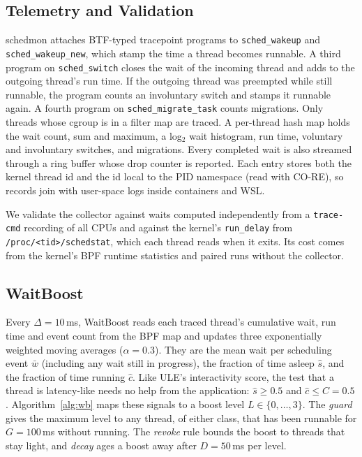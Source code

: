 \documentclass[conference]{IEEEtran}
\newcommand{\ms}{\,ms}
\begin{document}
\subsection{Telemetry and Validation}
schedmon attaches BTF-typed tracepoint programs to \texttt{sched\_wakeup} and \texttt{sched\_wakeup\_new}, which stamp the time a thread becomes runnable. A third program on \texttt{sched\_switch} closes the wait of the incoming thread and adds to the outgoing thread's run time. If the outgoing thread was preempted while still runnable, the program counts an involuntary switch and stamps it runnable again. A fourth program on \texttt{sched\_migrate\_task} counts migrations. Only threads whose cgroup is in a filter map are traced. A per-thread hash map holds the wait count, sum and maximum, a log$_2$ wait histogram, run time, voluntary and involuntary switches, and migrations. Every completed wait is also streamed through a ring buffer whose drop counter is reported. Each entry stores both the kernel thread id and the id local to the PID namespace (read with CO-RE), so records join with user-space logs inside containers and WSL.

We validate the collector against waits computed independently from a \texttt{trace-cmd} recording of all CPUs and against the kernel's \texttt{run\_delay} from \texttt{/proc/<tid>/schedstat}, which each thread reads when it exits. Its cost comes from the kernel's BPF runtime statistics and paired runs without the collector.

\subsection{WaitBoost}\label{sec:waitboost}
Every $\Delta=10$\ms, WaitBoost reads each traced thread's cumulative wait, run time and event count from the BPF map and updates three exponentially weighted moving averages ($\alpha=0.3$). They are the mean wait per scheduling event $\bar w$ (including any wait still in progress), the fraction of time asleep $\hat s$, and the fraction of time running $\hat c$. Like ULE's interactivity score, the test that a thread is latency-like needs no help from the application: $\hat s \ge 0.5$ and $\hat c \le C = 0.5$. Algorithm~\ref{alg:wb} maps these signals to a boost level $L \in \{0,\dots,3\}$. The \emph{guard} gives the maximum level to any thread, of either class, that has been runnable for $G=100$\ms{} without running. The \emph{revoke} rule bounds the boost to threads that stay light, and \emph{decay} ages a boost away after $D=50$\ms{} per level.
\end{document}
